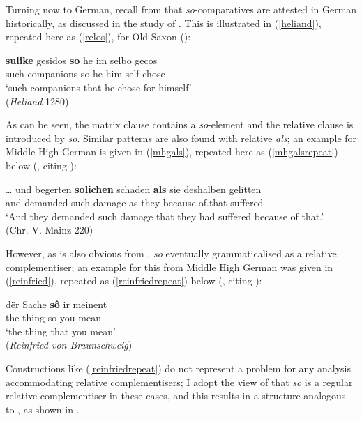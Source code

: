 Turning now to German, recall from  that \textit{so}-comparatives are attested in German historically, as discussed in the study of \citet{brandnerbraeuning2013}. This is illustrated in (\ref{heliand}), repeated here as (\ref{relos}), for Old Saxon (\citealt[138, ex. 20]{brandnerbraeuning2013}):

\ea \gll \textbf{sulike} gesidos \textbf{so} he im selbo gecos \label{relos}\\
such companions so he him self chose\\
\glt `such companions that he chose for himself'\\(\textit{Heliand} 1280)
\z

As can be seen, the matrix clause contains a \textit{so}-element and the relative clause is introduced by \textit{so}. Similar patterns are also found with relative \textit{als}; an example for Middle High German is given in (\ref{mhgals}), repeated here as (\ref{mhgalsrepeat}) below (\citealt[136, ex. 13]{brandnerbraeuning2013}, citing \citealt{ebertreichmannsolmswegera1993}):

\ea \gll \ldots{} und begerten \textbf{solichen} schaden \textbf{als} sie deshalben gelitten \label{mhgalsrepeat}\\
{} and demanded such damage as they because.of.that suffered\\
\glt `And they demanded such damage that they had suffered because of that.'\\(Chr. V. Mainz 220)
\z

However, as is also obvious from \citet{brandnerbraeuning2013}, \textit{so} eventually grammaticalised as a relative complementiser; an example for this from Middle High German was given in (\ref{reinfried}), repeated as (\ref{reinfriedrepeat}) below (\citealt[132]{brandnerbraeuning2013}, citing \citealt{paul1920band3}):

\ea \gll d\"er Sache \textbf{s\^{o}} ir meinent \label{reinfriedrepeat}\\
the thing so you mean\\
\glt `the thing that you mean'\\(\textit{Reinfried von Braunschweig})
\z

Constructions like (\ref{reinfriedrepeat}) do not represent a problem for any analysis accommodating relative complementisers; I adopt the view of \citet{brandnerbraeuning2013} that \textit{so} is a regular relative complementiser in these cases, and this results in a structure analogous to , as shown in .

